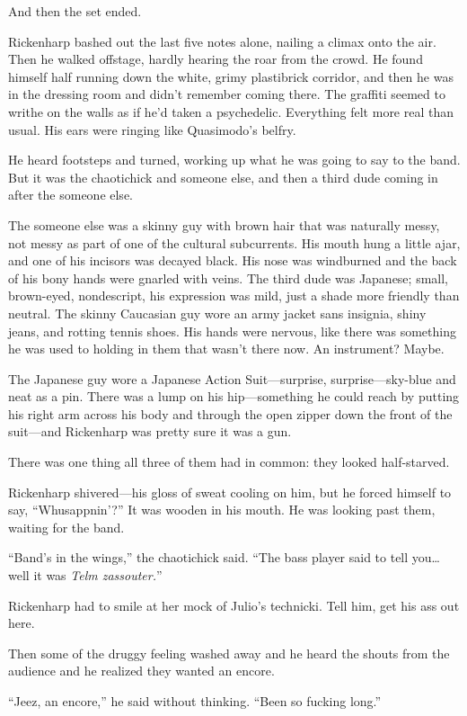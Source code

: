 And then the set ended.

Rickenharp bashed out the last five notes alone, nailing a climax onto the air. Then he walked offstage, hardly hearing the roar from the crowd. He found himself half running down the white, grimy plastibrick corridor, and then he was in the dressing room and didn't remember coming there. The graffiti seemed to writhe on the walls as if he'd taken a psychedelic. Everything felt more real than usual. His ears were ringing like Quasimodo's belfry.

He heard footsteps and turned, working up what he was going to say to the band. But it was the chaotichick and someone else, and then a third dude coming in after the someone else.

The someone else was a skinny guy with brown hair that was naturally messy, not messy as part of one of the cultural subcurrents. His mouth hung a little ajar, and one of his incisors was decayed black. His nose was windburned and the back of his bony hands were gnarled with veins. The third dude was Japanese; small, brown-eyed, nondescript, his expression was mild, just a shade more friendly than neutral. The skinny Caucasian guy wore an army jacket sans insignia, shiny jeans, and rotting tennis shoes. His hands were nervous, like there was something he was used to holding in them that wasn't there now. An instrument? Maybe.

The Japanese guy wore a Japanese Action Suit---surprise, surprise---sky-blue and neat as a pin. There was a lump on his hip---something he could reach by putting his right arm across his body and through the open zipper down the front of the suit---and Rickenharp was pretty sure it was a gun.

There was one thing all three of them had in common: they looked half-starved.

Rickenharp shivered---his gloss of sweat cooling on him, but he forced himself to say, ``Whusappnin'?'' It was wooden in his mouth. He was looking past them, waiting for the band.

``Band's in the wings,'' the chaotichick said. ``The bass player said to tell you\ldots well it was \textit{Telm zassouter.}''

Rickenharp had to smile at her mock of Julio's technicki. Tell him, get his ass out here.

Then some of the druggy feeling washed away and he heard the shouts from the audience and he realized they wanted an encore.

``Jeez, an encore,'' he said without thinking. ``Been so fucking long.''

